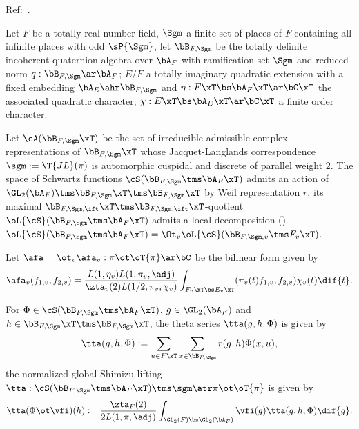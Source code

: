 \documentclass[article, a4paper, twoside]{universal}
\begin{document}
\confighead{}{}{}


Ref:~\cite{YZZ2013,YZ2018,YZ2018Erratum,Yuan2022}.

\begin{stp}
    Let $F$ be a totally real number field, $\Sgm$ a finite set of places of $F$ containing all infinite places with odd $\sP{\Sgm}$, let $\bB_{F,\Sgm}$ be the totally definite incoherent quaternion algebra over $\bA_{F}$ with ramification set $\Sgm$ and reduced norm $q:\bB_{F,\Sgm}\ar\bA_{F}$; $E/F$ a totally imaginary quadratic extension with a fixed embedding $\bA_{E}\ahr\bB_{F,\Sgm}$ and $\eta:F\xT\bs\bA_{F}\xT\ar\bC\xT$ the associated quadratic character; $\chi:E\xT\bs\bA_{E}\xT\ar\bC\xT$ a finite order character.

    Let $\cA(\bB_{F,\Sgm}\xT)$ be the set of irreducible admissible complex representations of $\bB_{F,\Sgm}\xT$ whose Jacquet-Langlands correspondence $\sgm:=\T{JL}(\pi)$ is automorphic cuspidal and discrete of parallel weight $2$. The space of Schwartz functions $\cS(\bB_{F,\Sgm}\tms\bA_{F}\xT)$ admits an action of $\GL_{2}(\bA_{F})\tms\bB_{F,\Sgm}\xT\tms\bB_{F,\Sgm}\xT$ by Weil representation $r$, its maximal $\bB_{F,\Sgm,\ift}\xT\tms\bB_{F,\Sgm,\ift}\xT$-quotient $\oL{\cS}(\bB_{F,\Sgm}\tms\bA_{F}\xT)$ admits a local decomposition (\cite[3.4.1]{YZZ2013}) $\oL{\cS}(\bB_{F,\Sgm}\tms\bA_{F}\xT)=\Ot_{v}\oL{\cS}(\bB_{F,\Sgm,v}\tms F_{v}\xT)$.

    Let $\afa=\ot_{v}\afa_{v}:\pi\ot\oT{\pi}\ar\bC$ be the bilinear form given by
    \[
        \afa_{v}(f_{1,v},f_{2,v})=\frac{L(1,\eta_{v})L(1,\pi_{v},\adj)}{\zta_{v}(2)L(1/2,\pi_{v},\chi_{v})}\int_{F_{v}\xT\bs E_{v}\xT}(\pi_{v}(t)f_{1,v},f_{2,v})\chi_{v}(t)\dif{t}.
    \]

    For $\Phi\in\cS(\bB_{F,\Sgm}\tms\bA_{F}\xT)$, $g\in\GL_{2}(\bA_{F})$ and $h\in\bB_{F,\Sgm}\xT\tms\bB_{F,\Sgm}\xT$, the theta series $\tta(g,h,\Phi)$ is given by
    \[
        \tta(g,h,\Phi):=\sum_{u\in F\xT}\sum_{x\in\bB_{F,\Sgm}}r(g,h)\Phi(x,u),
    \]
    the normalized global Shimizu lifting $\tta:\cS(\bB_{F,\Sgm}\tms\bA_{F}\xT)\tms\sgm\atr\pi\ot\oT{\pi}$ is given by
    \[
        \tta(\Phi\ot\vfi)(h):=\frac{\zta_{F}(2)}{2L(1,\pi,\adj)}\int_{\GL_{2}(F)\bs\GL_{2}(\bA_{F})}\vfi(g)\tta(g,h,\Phi)\dif{g}.
    \]
\end{stp}


\end{document}
